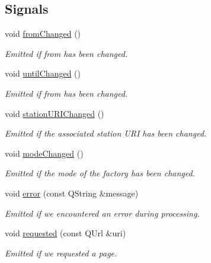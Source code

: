 \subsection*{Signals}
\begin{DoxyCompactItemize}
\item 
void \mbox{\hyperlink{classQRail_1_1LiveboardEngine_1_1Factory_a32f0025c70c2c793d66208f558a7a355}{from\+Changed}} ()
\begin{DoxyCompactList}\small\item\em Emitted if from has been changed. \end{DoxyCompactList}\item 
void \mbox{\hyperlink{classQRail_1_1LiveboardEngine_1_1Factory_a81b9ba54949f8389e63a65c4e91e3d19}{until\+Changed}} ()
\begin{DoxyCompactList}\small\item\em Emitted if from has been changed. \end{DoxyCompactList}\item 
void \mbox{\hyperlink{classQRail_1_1LiveboardEngine_1_1Factory_ac879b9931b3168dceb8e3ad111aa774c}{station\+U\+R\+I\+Changed}} ()
\begin{DoxyCompactList}\small\item\em Emitted if the associated station U\+RI has been changed. \end{DoxyCompactList}\item 
void \mbox{\hyperlink{classQRail_1_1LiveboardEngine_1_1Factory_a77c3c40bf35560a3893a3f162156f41a}{mode\+Changed}} ()
\begin{DoxyCompactList}\small\item\em Emitted if the mode of the factory has been changed. \end{DoxyCompactList}\item 
void \mbox{\hyperlink{classQRail_1_1LiveboardEngine_1_1Factory_a0c8fab5c22d9a46f00afea2fd9224421}{error}} (const Q\+String \&message)
\begin{DoxyCompactList}\small\item\em Emitted if we encountered an error during processing. \end{DoxyCompactList}\item 
void \mbox{\hyperlink{classQRail_1_1LiveboardEngine_1_1Factory_a81b2d8c3bde4886199fba81e09fd8cdd}{requested}} (const Q\+Url \&uri)
\begin{DoxyCompactList}\small\item\em Emitted if we requested a page. \end{DoxyCompactList}\item 

\end{DoxyCompactItemize}
